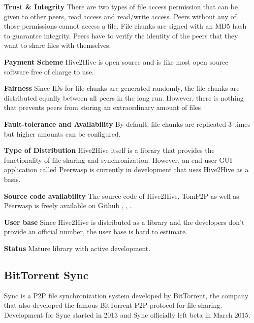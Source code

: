 \textbf{Trust \& Integrity}
There are two types of file access permission that can be given to other peers, read access and read/write access. Peers without any of those permissions cannot access a file. File chunks are signed with an MD5 hash to guarantee integrity. Peers have to verify the identity of the peers that they want to share files with themselves.

\textbf{Payment Scheme}
Hive2Hive is open source and is like most open source software free of charge to use.

\textbf{Fairness}
Since IDs for file chunks are generated randomly, the file chunks are distributed equally between all peers in the long run. However, there is nothing that prevents peers from storing an extraordinary amount of files

\textbf{Fault-tolerance and Availability}
By default, file chunks are replicated 3 times but higher amounts can be configured.

\textbf{Type of Distribution}
Hive2Hive itself is a library that provides the functionality of file sharing and synchronization. However, an end-user GUI application called Peerwasp \cite{peerwasp} is currently in development that uses Hive2Hive as a basis.

\textbf{Source code availability}
The source code of Hive2Hive, TomP2P as well as Peerwasp is freely available on Github \cite{hive2hive:github}, \cite{tomp2p:github}, \cite{peerwasp:github}. 

\textbf{User base}
Since Hive2Hive is distributed as a library and the developers don't provide an official number, the user base is hard to estimate.

\textbf{Status}
Mature library with active development.

\subsection{BitTorrent Sync}
Sync is a P2P file synchronization system developed by BitTorrent, the company that also developed the famous BitTorrent P2P protocol for file sharing. Development for Sync started in 2013 and Sync officially left beta in March 2015.


